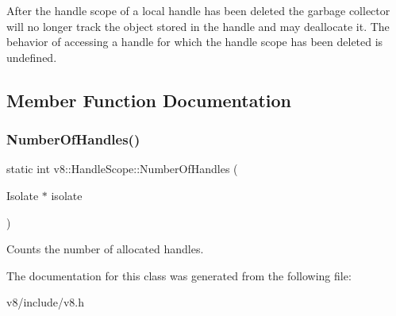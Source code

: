 After the handle scope of a local handle has been deleted the garbage collector will no longer track the object stored in the handle and may deallocate it. The behavior of accessing a handle for which the handle scope has been deleted is undefined. 

\subsection{Member Function Documentation}
\mbox{\label{classv8_1_1HandleScope_abab7214c9b9388b02f575fd5270b7e2f}} 
\subsubsection{\texorpdfstring{Number\+Of\+Handles()}{NumberOfHandles()}}
{\footnotesize\ttfamily static int v8\+::\+Handle\+Scope\+::\+Number\+Of\+Handles (\begin{DoxyParamCaption}\item[{Isolate $\ast$}]{isolate }\end{DoxyParamCaption})\hspace{0.3cm}{\ttfamily [static]}}

Counts the number of allocated handles. 

The documentation for this class was generated from the following file\+:\begin{DoxyCompactItemize}
\item 
v8/include/v8.\+h\end{DoxyCompactItemize}
